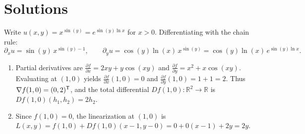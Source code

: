 
\section{Solutions}
\label{sec:differential_solutions}

\begin{exercisesolution}
\label{sol:derivative_computation_exponential}
Write $u(x,y) = x^{\sin(y)} = e^{\sin(y)\ln x}$ for $x > 0$. Differentiating with the chain rule:
\[
\partial_x u = \sin(y)\,x^{\sin(y)-1}, \qquad \partial_y u = \cos(y)\ln(x)\,x^{\sin(y)} = \cos(y)\ln(x)\,e^{\sin(y)\ln x}.
\]
\end{exercisesolution}

\begin{exercisesolution}
\label{sol:ai_differential_linearization}
\begin{enumerate}[label=\textbf{(\alph*)}]
  \item Partial derivatives are $\frac{\partial f}{\partial x} = 2xy + y\cos(xy)$ and $\frac{\partial f}{\partial y} = x^2 + x\cos(xy)$. Evaluating at $(1,0)$ yields $\frac{\partial f}{\partial x}(1,0) = 0$ and $\frac{\partial f}{\partial y}(1,0) = 1 + 1 = 2$. Thus $\nabla f(1,0) = (0, 2)^{\mathsf{T}}$, and the total differential $Df(1,0) \colon \mathbb{R}^2 \to \mathbb{R}$ is $Df(1,0)(h_1, h_2) = 2h_2$.
  \item Since $f(1,0) = 0$, the linearization at $(1,0)$ is $L(x,y) = f(1,0) + Df(1,0)(x-1, y-0) = 0 + 0(x-1) + 2y = 2y$.
\end{enumerate}
\end{exercisesolution}

